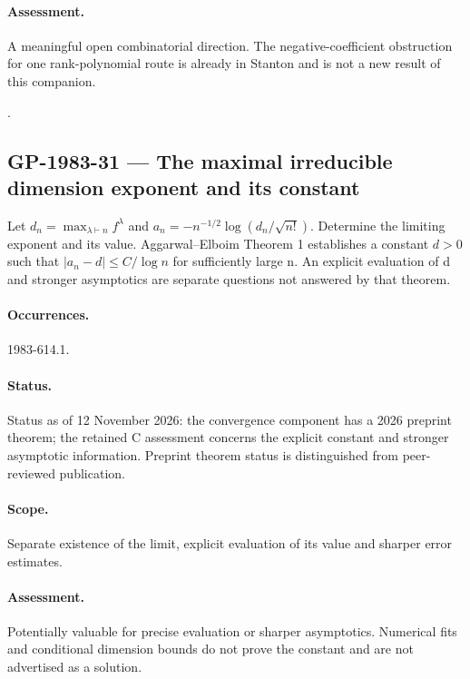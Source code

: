 \paragraph{Assessment.} A meaningful open combinatorial direction. The negative-coefficient obstruction for one rank-polynomial route is already in Stanton and is not a new result of this companion.

\noindent\citep{atkinswinnertondyer1954partitions,stanton2019problems,stanton2019rankcrank}.

\subsection{GP-1983-31 --- The maximal irreducible dimension exponent and its constant}

\label{problem:GP-1983-31}

Let $d_n=\max_{\lambda\vdash n}f^\lambda$ and $a_n=-n^{-1/2}\log(d_n/\sqrt{n!})$. Determine the limiting exponent and its value. Aggarwal--Elboim Theorem 1 establishes a constant $d>0$ such that $|a_n-d|\leq C/\log n$ for sufficiently large n. An explicit evaluation of d and stronger asymptotics are separate questions not answered by that theorem.

\paragraph{Occurrences.} 1983-614.1.

\paragraph{Status.} Status as of 12 November 2026: the convergence component has a 2026 preprint theorem; the retained C assessment concerns the explicit constant and stronger asymptotic information. Preprint theorem status is distinguished from peer-reviewed publication.

\paragraph{Scope.} Separate existence of the limit, explicit evaluation of its value and sharper error estimates.

\paragraph{Assessment.} Potentially valuable for precise evaluation or sharper asymptotics. Numerical fits and conditional dimension bounds do not prove the constant and are not advertised as a solution.

